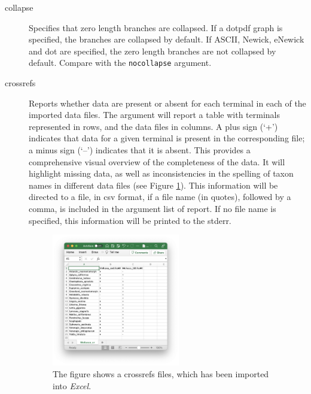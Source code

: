 \begin{description}
		\item[collapse] Specifies that zero length branches are collapsed. If a dotpdf 
		graph is specified, the branches are collapsed by default. If ASCII, Newick, 
		eNewick and dot are specified, the zero length branches are not collapsed by 
		default. Compare with the \texttt{nocollapse} argument.	
		
		\item[crossrefs] Reports whether data are present or absent for each terminal 
		in each of the imported data files. The argument will report a table with terminals 
		represented in rows, and the data files in columns. A plus sign (`+') indicates that 
		data for a given terminal is present in the corresponding file; a minus sign (`--') 
		indicates that it is absent. This provides a comprehensive visual overview of the 
		completeness of the data. It will highlight missing data, as well as inconsistencies 
		in the spelling of taxon names in different data files (see Figure \ref{crossrefs}). 
		This information will be directed to a file, in csv format, if a file name (in quotes), 
		followed by a comma, is included in the argument list of report. If no file name is 
		specified, this information will be printed to the stderr.
		
		\begin{figure}
		\centering
		\includegraphics[width=0.55\textwidth]{crossrefs1.png}
		\caption{The figure shows a crossrefs files, which has been imported into 
		\textit{Excel}.}
		\label{crossrefs}
		\end{figure}
			

\end{description}
